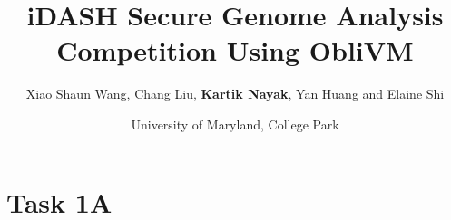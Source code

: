 \documentclass[t,ignorenonframetext]{beamer}
\title[]{iDASH Secure Genome Analysis Competition Using ObliVM}
\author[]{Xiao Shaun Wang, Chang Liu, \textbf{Kartik Nayak}, Yan Huang and Elaine Shi}
\date{University of Maryland, College Park}
\newcommand\myblock[4]{%
\begin{textblock}{#1}(#2, #3)%
  \begin{center}
    #4
  \end{center}
\end{textblock}
}
\newcommand\leftblock[4]{%
\begin{textblock}{#1}(#2, #3)%
  \vspace*{\fill}
    #4
  \vspace*{\fill}
\end{textblock}
}
\begin{document}
\frame{
\maketitle
}
\section{Task 1A}

\begin{comment}
\begin{frame}{Compute MAF}
\begin{itemize}
\item Compute minor allele frequencies
\myblock{10}{0}{1}{Alice\\
$l^A = (e^A_1,...,e^A_n)$
}
\myblock{10}{10}{1}{Bob\\
$l^B = (e^B_1,...,e^B_n)$
}
\pause
\myblock{20}{0}{4}{where $e_i^X \in \{A, T, C, G\}$}
\pause
\myblock{10}{0}{6}{
AA AC AA\\
\color{green}{$f_1^A = 5, f_2^A = 1$}
}
\myblock{10}{10}{6}{
AA AC CC\\
{\color{green}$f_1^B = 3, f_2^B = 3$}
}
\myblock{20}{0}{9}{
Compute $min(f^A_1+f^A_1, f^B_2+f^B_2)$
}
\pause
\myblock{20}{0}{11}{
Secure Computation\\
{\color{red}$(f_1, f_2) = (f^A_1+f^A_1, f^B_2+f^B_2)$}\\
\pause
40 AND gates
}
\end{itemize}
\end{frame}

\section{Task 1B}
\label{sec:task1b}

\begin{frame}{Problem Statement: Compute $\chi^2$ statistic}
  \begin{itemize}
    \item Task 1b: Computing $\chi^2$ statistic
    \myblock{10}{0}{1}{Alice\\
      $l^A_{case} = (e^A_1,...,e^A_n)$\\
      $l^A_{control} = (e'^A_1,...,e'^A_n)$
    }
    \myblock{10}{10}{1}{Bob\\
      $l^B_{case} = (e^B_1,...,e^B_n)$\\
      $l^B_{control} = (e'^B_1,...,e'^B_n)$
    }
    \pause
    \leftblock{20}{0}{5}{
      $a, b$: frequencies of two alleles in $l_{case} = l^A_{case} || l^B_{case}$\\
      $c, d$: frequencies of two alleles in $l_{control} = l^A_{control} || l^B_{control}$
    }
    \pause
    \myblock{20}{0}{8}{
      $\chi^2 = n\times\frac{(ad-bc)^2}{rsgk}$\\
      where $r = a + b, s = c + d, g = a + c,$\\$k = b + d, n =  r + s$
    }
  \end{itemize}
\end{frame}


\end{comment}
\end{document}
